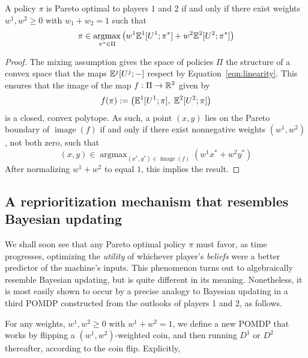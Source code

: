 \documentclass{article}
\newcommand{\eqn}[1]{Equation~\ref{eqn:#1}}
\DeclareMathOperator*{\argmax}{argmax}
\DeclareMathOperator{\image}{image}
\begin{document}
\begin{lemma}\label{lem:pareto}
A policy $\pi$ is Pareto optimal to players $1$ and $2$ if and only if there exist weights $w^1,w^2\geq 0$ with $w_1+w_2=1$ such that
\begin{equation}\label{eqn:pareto}
\pi \in \argmax_{\pi^* \in\Pi}\left(w^1\EE^1[U^1;\pi^*] + w^2\EE^2[U^2; \pi^*]\right)
\end{equation}
\end{lemma}

\begin{proof}
The mixing assumption gives the space of policies $\Pi$ the structure of a convex space that the maps $\mathbb{E}^j[U^j; -] $ respect by \eqn{linearity}.  This ensures that the image of the map $f:\Pi\to\mathbb{R}^2$ given by
\[
f(\pi) := \left(\mathbb{E}^1[U^1;\pi],\; \mathbb{E}^2[U^2;\pi]\right)
\]
is a closed, convex polytope.  As such, a point $(x,y)$ lies on the Pareto boundary of $\image(f)$ if and only if there exist nonnegative weights $(w^1,w^2)$, not both zero, such that 
\[
(x,y) \in \argmax_{(x^*,y^*)\in \image(f)} \left(w^1x^* + w^2y^*\right)
\]
After normalizing $w^1+w^2$ to equal $1$, this implies the result.
\end{proof}

\subsection{A reprioritization mechanism that resembles Bayesian updating}

We shall soon see that any Pareto optimal policy $\pi$ must favor, as time progresses, optimizing the \emph{utility} of whichever player's \emph{beliefs} were a better predictor of the machine's inputs.  This phenomenon turns out to algebraically resemble Bayesian updating, but is quite different in its meaning.  Nonetheless, it is most easily shown to occur by a precise analogy to Bayesian updating in a third POMDP constructed from the outlooks of players 1 and 2, as follows.

For any weights, $w^1,w^2\ge 0$ with $w^1+w^2=1$, we define a new POMDP that works by flipping a $(w^1,w^2)$-weighted coin, and then running $D^1$ or $D^2$ thereafter, according to the coin flip.  Explicitly, 
\end{document}
